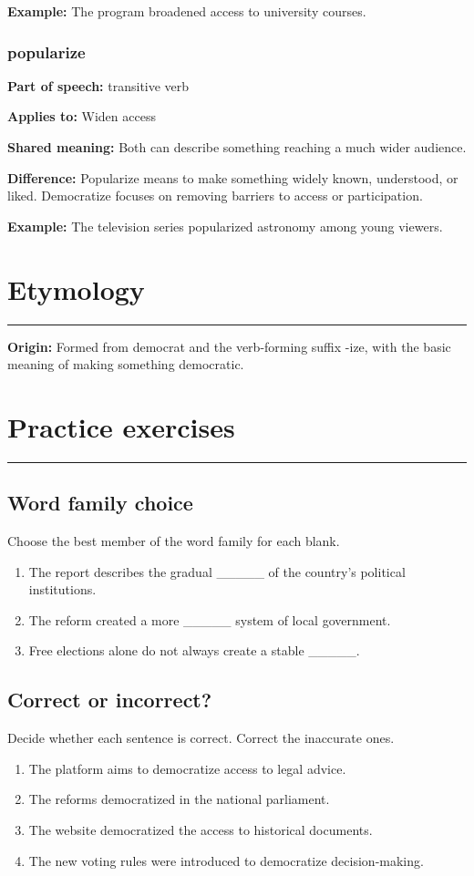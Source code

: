 \documentclass[11pt]{article}
\newcommand{\sectionrule}{\par\vspace{-0.5em}\noindent\textcolor{Accent}{\rule{\linewidth}{0.6pt}}\par}
\begin{document}
\textbf{Example:} The program broadened access to university courses.

\subsubsection{popularize}
\textbf{Part of speech:} transitive verb

\textbf{Applies to:} Widen access

\textbf{Shared meaning:} Both can describe something reaching a much wider audience.

\textbf{Difference:} Popularize means to make something widely known, understood, or liked. Democratize focuses on removing barriers to access or participation.

\textbf{Example:} The television series popularized astronomy among young viewers.

\section{Etymology}
\sectionrule
\textbf{Origin:} Formed from democrat and the verb-forming suffix -ize, with the basic meaning of making something democratic.

\section{Practice exercises}
\sectionrule
\subsection{Word family choice}
Choose the best member of the word family for each blank.

\begin{enumerate}
  \item The report describes the gradual \_\_\_\_\_ of the country's political institutions.
  \item The reform created a more \_\_\_\_\_ system of local government.
  \item Free elections alone do not always create a stable \_\_\_\_\_.
\end{enumerate}

\subsection{Correct or incorrect?}
Decide whether each sentence is correct. Correct the inaccurate ones.

\begin{enumerate}
  \item The platform aims to democratize access to legal advice.
  \item The reforms democratized in the national parliament.
  \item The website democratized the access to historical documents.
  \item The new voting rules were introduced to democratize decision-making.
\end{enumerate}
\end{document}
